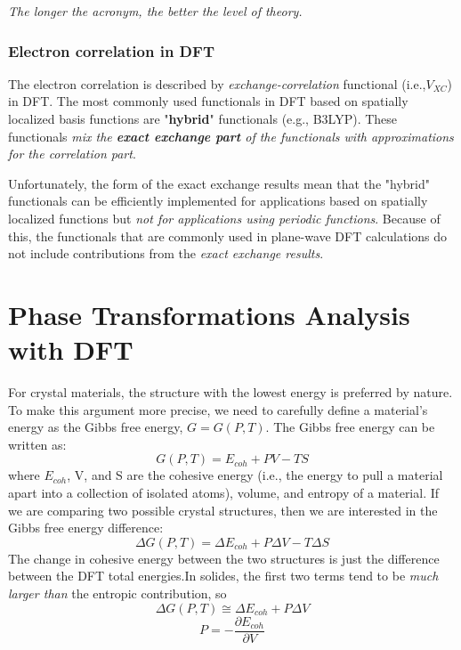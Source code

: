 \documentclass[12pt]{article}
\begin{document}
\emph{The longer the acronym, the better the level of theory.}

\subsubsection{Electron correlation in DFT}
The electron correlation is described by \emph{exchange-correlation} functional (i.e.,$V_{XC}$) in DFT. The most commonly used functionals in DFT based on spatially localized basis functions are "\textbf{hybrid}" functionals (e.g., B3LYP). These functionals \textit{mix the \textbf{exact exchange part} of the functionals with approximations for the correlation part}.

Unfortunately, the form of the exact exchange results mean that the "hybrid" functionals can be efficiently implemented for applications based on spatially localized functions but \textit{not for applications using periodic functions}. Because of this, the functionals that are commonly used in plane-wave DFT calculations do not include contributions from the \emph{exact exchange results}.

\section{Phase Transformations Analysis with DFT}
For crystal materials, the structure with the lowest energy is preferred by nature. To make this argument more precise, we need to carefully define a material's energy as the Gibbs free energy, $G=G(P, T)$. The Gibbs free energy can be written as:
\begin{equation}
    G(P, T) = E_{coh} + PV - TS
\end{equation}
where $E_{coh}$, V, and S are the cohesive energy (i.e., the energy to pull a material apart into a collection of isolated atoms), volume, and entropy of a material. If we are comparing two possible crystal structures, then we are interested in the Gibbs free energy difference:
\begin{equation}
    \Delta G(P,T)=\Delta E_{coh}+P\Delta V - T \Delta S
\end{equation}
The change in cohesive energy between the two structures is just the difference between the DFT total energies.In solides, the first two terms tend to be \emph{much larger than }the entropic contribution, so
\begin{equation}
    \label{gibbs}
    \Delta G(P,T)\cong\Delta E_{coh}+P\Delta V 
\end{equation}
\begin{equation}
    P=-\frac{\partial E_{coh}}{\partial V} 
\end{equation}
\end{document}
